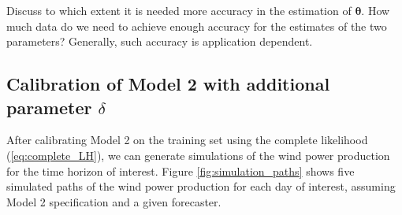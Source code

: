 \documentclass[11pt]{article}
\theoremstyle{definition}
\begin{document}
{\color{red} Discuss to which extent it is needed more accuracy in the estimation of $\bm{\theta}$. How much data do we need to achieve enough accuracy for the estimates of the two parameters? Generally, such accuracy is application dependent.}

\subsection{Calibration of Model 2 with additional parameter $\delta$}

After calibrating Model 2 on the training set using the complete likelihood (\ref{eq:complete_LH}), we can generate simulations of the wind power production for the time horizon of interest. Figure \ref{fig:simulation_paths} shows five simulated paths of the wind power production for each day of interest, assuming Model 2 specification and a given forecaster.
\end{document}
